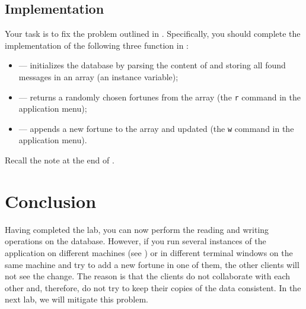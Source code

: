\documentclass[a4paper,10pt]{article}
\begin{document}
\subsection{Implementation}
Your task is to fix the problem outlined in . Specifically,
you should complete the implementation of the following three function in
:
\begin{itemize}

  \item {} --- initializes the database by parsing the content
  of  and storing all found messages in an array (an
  instance variable);

  \item {} --- returns a randomly chosen fortunes from the array (the
  \texttt{r} command in the application menu);

  \item {} --- appends a new fortune to the array and updated
   (the \texttt{w} command in the application menu).

\end{itemize}
Recall the note at the end of .

\section{Conclusion}
Having completed the lab, you can now perform the reading and writing operations
on the database. However, if you run several instances of the application on
different machines (see ) or in different terminal
windows on the same machine and try to add a new fortune in one of them, the
other clients will not see the change. The reason is that the clients do not
collaborate with each other and, therefore, do not try to keep their copies of
the data consistent. In the next lab, we will mitigate this problem.

\printbibliography
\end{document}
